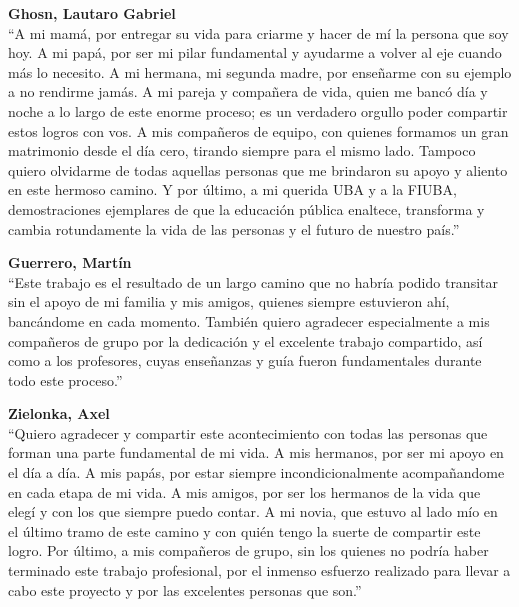 \vspace{0.3cm}

\noindent \textbf{Ghosn, Lautaro Gabriel} \\
``A mi mamá, por entregar su vida para criarme y hacer de mí la persona que soy hoy. A mi papá, por ser mi pilar fundamental y ayudarme a volver al eje cuando más lo necesito. A mi hermana, mi segunda madre, por enseñarme con su ejemplo a no rendirme jamás. A mi pareja y compañera de vida, quien me bancó día y noche a lo largo de este enorme proceso; es un verdadero orgullo poder compartir estos logros con vos. A mis compañeros de equipo, con quienes formamos un gran matrimonio desde el día cero, tirando siempre para el mismo lado. Tampoco quiero olvidarme de todas aquellas personas que me brindaron su apoyo y aliento en este hermoso camino. Y por último, a mi querida UBA y a la FIUBA, demostraciones ejemplares de que la educación pública enaltece, transforma y cambia rotundamente la vida de las personas y el futuro de nuestro país.''

\vspace{0.3cm}

\noindent \textbf{Guerrero, Martín} \\
``Este trabajo es el resultado de un largo camino que no habría podido transitar sin el apoyo de mi familia y mis amigos, quienes siempre estuvieron ahí, bancándome en cada momento. También quiero agradecer especialmente a mis compañeros de grupo por la dedicación y el excelente trabajo compartido, así como a los profesores, cuyas enseñanzas y guía fueron fundamentales durante todo este proceso.''

\vspace{0.3cm}

\noindent \textbf{Zielonka, Axel} \\
``Quiero agradecer y compartir este acontecimiento con todas las personas que forman una parte fundamental de mi vida. A mis hermanos, por ser mi apoyo en el día a día. A mis papás, por estar siempre incondicionalmente acompañandome en cada etapa de mi vida. A mis amigos, por ser los hermanos de la vida que elegí y con los que siempre puedo contar. A mi novia, que estuvo al lado mío en el último tramo de este camino y con quién tengo la suerte de compartir este logro. Por último, a mis compañeros de grupo, sin los quienes no podría haber terminado este trabajo profesional, por el inmenso esfuerzo realizado para llevar a cabo este proyecto y por las excelentes personas que son.''
